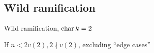 \subsection{Wild ramification} \label{sec:wild_ramification}

\begin{frame}
	{Wild ramification, $\operatorname{char} k = 2$}

\begin{figure}[ht]
    \centering
\end{figure}

\end{frame}
\begin{frame}
	If $n < 2v(2), 2 \nmid v(2)$, excluding ``edge cases''
\begin{figure}[ht]
    \centering
\end{figure}
\end{frame}
